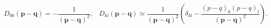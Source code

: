 \begin{equation}
D_{00}\left( \mathbf{p-q}\right) =-\frac{1}{\left( \mathbf{p-q}\right) ^{2}}%
,\;\;\;D_{kl}\left( \mathbf{p-q}\right) \simeq \frac{1}{\left( \mathbf{p-q}%
\right) ^{2}}\left( \delta _{kl}-\frac{\left( p-q\right) _{k}\left(
p-q\right) _{l}}{\left( \mathbf{p-q}\right) ^{2}}\right) .
\end{equation}

